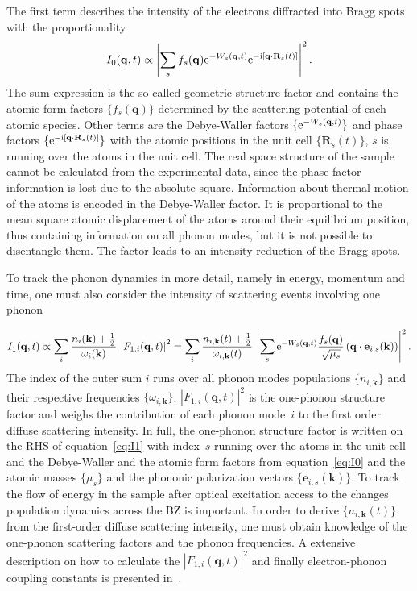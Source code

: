 The first term describes the intensity of the electrons diffracted into Bragg spots with the proportionality
\begin{equation} I_0(\mathbf{q}, t) \propto \left| \sum_s f_s(\mathbf{q}) \mathrm{e}^{-W_s(\mathbf{q},t)} \mathrm{e}^{-\mathrm{i}[\mathbf{q}\cdot\mathbf{R}_s(t)]} \right| ^2.\label{eq:I0}\end{equation}
The sum expression is the so called geometric structure factor and contains the atomic form factors $\{f_s(\mathbf{q})\}$ determined by the scattering potential of each atomic species.
Other terms are the Debye-Waller factors $\{\mathrm{e}^{-W_s(\mathbf{q},t)}\}$ and phase factors $\{\mathrm{e}^{-\mathrm{i}[\mathbf{q}\cdot\mathbf{R}_s(t)]}\}$ with the atomic positions in the unit cell $\{\mathbf{R}_s(t)\}$, $s$ is running over the atoms in the unit cell.
The real space structure of the sample cannot be calculated from the experimental data, since the phase factor information is lost due to the absolute square.
Information about thermal motion of the atoms is encoded in the Debye-Waller factor.
It is proportional to the mean square atomic displacement of the atoms around their equilibrium position, thus containing information on all phonon modes, but it is not possible to disentangle them.
The factor leads to an intensity reduction of the Bragg spots.

To track the phonon dynamics in more detail, namely in energy, momentum and time, one must also consider the intensity of scattering events involving one phonon

\begin{equation} I_1(\mathbf{q},t) \propto \sum_i \frac{n_i(\mathbf{k})+\frac{1}{2}}{\omega_i(\mathbf{k})}\,\left| F_{1,i}(\mathbf{q},t) \right|^2 = \sum_i \frac{n_{i,\mathbf{k}}(t)+\frac{1}{2}}{\omega_{i,\mathbf{k}}(t)}\,\left| \sum_s \mathrm{e}^{-W_s(\mathbf{q},t)} \frac{f_s(\mathbf{q})}{\sqrt{\mu_s}} \left( \mathbf{q}\cdot\mathbf{e}_{i, s}(\mathbf{k}) \right) \right|^2.\label{eq:I1}\end{equation}
The index of the outer sum $i$ runs over all phonon modes populations $\{n_{i,\mathbf{k}}\}$ and their respective frequencies $\{\omega_{i,\mathbf{k}}\}$.
$\left| F_{1,i}(\mathbf{q},t) \right|^2$ is the one-phonon structure factor and weighs the contribution of each phonon mode~$i$ to the first order diffuse scattering intensity.
In full, the one-phonon structure factor is written on the RHS of equation~\ref{eq:I1} with index~$s$ running over the atoms in the unit cell and the Debye-Waller and the atomic form factors from equation~\ref{eq:I0} and the atomic masses $\{\mu_s\}$ and the phononic polarization vectors $\{\mathbf{e}_{i, s}(\mathbf{k})\}$.
To track the flow of energy in the sample after optical excitation access to the changes population dynamics across the \ac{BZ} is important.
In order to derive $\{n_{i,\mathbf{k}}(t)\}$ from the first-order diffuse scattering intensity, one must obtain knowledge of the one-phonon scattering factors and the phonon frequencies.
A extensive description on how to calculate the $\left| F_{1,i}(\mathbf{q},t) \right|^2$ and finally electron-phonon coupling constants is presented in~\cite{stern2018,renedecotret2019}.

